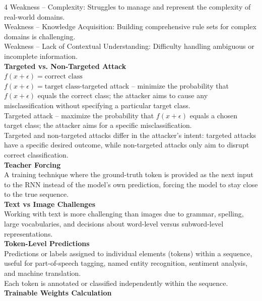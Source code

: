 \documentclass[8pt]{extarticle}
\begin{document}
\begin{multicols}{4}
Weakness -- Complexity: Struggles to manage and represent the complexity of real-world domains.\\
Weakness -- Knowledge Acquisition: Building comprehensive rule sets for complex domains is challenging.\\
Weakness -- Lack of Contextual Understanding: Difficulty handling ambiguous or incomplete information.\\
\vspace{2pt}\textbf{Targeted vs. Non-Targeted Attack}\\
$f(x + \epsilon) = \text{correct class}$ \\
$f(x + \epsilon) = \text{target class}$\Non-targeted attack -- minimize the probability that $f(x + \epsilon)$ equals the correct class; the attacker aims to cause any misclassification without specifying a particular target class.\\
Targeted attack -- maximize the probability that $f(x + \epsilon)$ equals a chosen target class; the attacker aims for a specific misclassification.\\
Targeted and non-targeted attacks differ in the attacker's intent: targeted attacks have a specific desired outcome, while non-targeted attacks only aim to disrupt correct classification.\\
\vspace{2pt}\textbf{Teacher Forcing}\\
A training technique where the ground-truth token is provided as the next input to the RNN instead of the model's own prediction, forcing the model to stay close to the true sequence.\\
\vspace{2pt}\textbf{Text vs Image Challenges}\\
Working with text is more challenging than images due to grammar, spelling, large vocabularies, and decisions about word-level versus subword-level representations.\\
\vspace{2pt}\textbf{Token-Level Predictions}\\
Predictions or labels assigned to individual elements (tokens) within a sequence, useful for part-of-speech tagging, named entity recognition, sentiment analysis, and machine translation.\\
Each token is annotated or classified independently within the sequence.\\
\vspace{2pt}\textbf{Trainable Weights Calculation}\\


\end{multicols}
\end{document}
